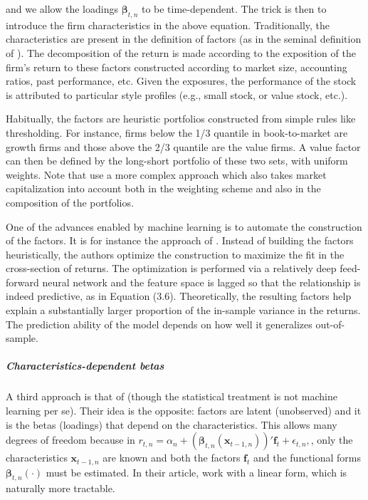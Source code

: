 and we allow the loadings $\boldsymbol{\beta}_{t,n}$ to be time-dependent. The trick is then to introduce the firm characteristics in the above equation. Traditionally, the characteristics are present in the definition of factors (as in the seminal definition of \cite{fama1993common}). The decomposition of the return is made according to the exposition of the firm's return to these factors constructed according to market size, accounting ratios, past performance, etc. Given the exposures, the performance of the stock is attributed to particular style profiles (e.g., small stock, or value stock, etc.).

Habitually, the factors are heuristic portfolios constructed from simple rules like thresholding. For instance, firms below the 1/3 quantile in book-to-market are growth firms and those above the 2/3 quantile are the value firms. A value factor can then be defined by the long-short portfolio of these two sets, with uniform weights. Note that \cite{fama1993common} use a more complex approach which also takes market capitalization into account both in the weighting scheme and also in the composition of the portfolios.

One of the advances enabled by machine learning is to automate the construction of the factors. It is for instance the approach of \cite{feng2019deep}. Instead of building the factors heuristically, the authors optimize the construction to maximize the fit in the cross-section of returns. The optimization is performed via a relatively deep feed-forward neural network and the feature space is lagged so that the relationship is indeed predictive, as in Equation (3.6). Theoretically, the resulting factors help explain a substantially larger proportion of the in-sample variance in the returns. The prediction ability of the model depends on how well it generalizes out-of-sample.

\subparagraph{Characteristics-dependent betas}

A third approach is that of \cite{kelly2019characteristics} (though the statistical treatment is not machine learning per se). Their idea is the opposite: factors are latent (unobserved) and it is the betas (loadings) that depend on the characteristics. This allows many degrees of freedom because in $r_{t,n}=\alpha_n+(\boldsymbol{\beta}_{t,n}(\textbf{x}_{t -1,n}))'\textbf{f}_t+\epsilon_{t,n},$, only the characteristics $\textbf{x}_{t -1,n}$ are known and both the factors $\textbf{f}_t$ and the functional forms $\boldsymbol{\beta}_{t,n}(\cdot)$ must be estimated. In their article, \cite{kelly2019characteristics} work with a linear form, which is naturally more tractable.

